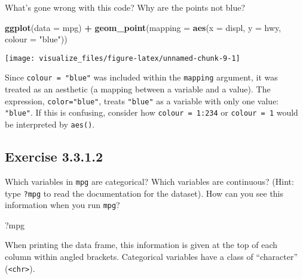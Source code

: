 \documentclass[]{book}
\newenvironment{Shaded}{\begin{snugshade}}{\end{snugshade}}
\newcommand{\DataTypeTok}[1]{\textcolor[rgb]{0.13,0.29,0.53}{#1}}
\newcommand{\KeywordTok}[1]{\textcolor[rgb]{0.13,0.29,0.53}{\textbf{#1}}}
\newcommand{\NormalTok}[1]{#1}
\newcommand{\OperatorTok}[1]{\textcolor[rgb]{0.81,0.36,0.00}{\textbf{#1}}}
\newcommand{\StringTok}[1]{\textcolor[rgb]{0.31,0.60,0.02}{#1}}
\theoremstyle{plain}
\theoremstyle{remark}
\begin{document}
What's gone wrong with this code? Why are the points not blue?

\begin{Shaded}
\begin{Highlighting}[]
\KeywordTok{ggplot}\NormalTok{(}\DataTypeTok{data =}\NormalTok{ mpg) }\OperatorTok{+}
\StringTok{  }\KeywordTok{geom_point}\NormalTok{(}\DataTypeTok{mapping =} \KeywordTok{aes}\NormalTok{(}\DataTypeTok{x =}\NormalTok{ displ, }\DataTypeTok{y =}\NormalTok{ hwy, }\DataTypeTok{colour =} \StringTok{"blue"}\NormalTok{))}
\end{Highlighting}
\end{Shaded}

\begin{center}\texttt{[image: visualize\_files/figure-latex/unnamed-chunk-9-1]} \end{center}

Since \texttt{colour\ =\ "blue"} was included within the
\texttt{mapping} argument, it was treated as an aesthetic (a mapping
between a variable and a value). The expression, \texttt{color="blue"},
treats \texttt{"blue"} as a variable with only one value:
\texttt{"blue"}. If this is confusing, consider how
\texttt{colour\ =\ 1:234} or \texttt{colour\ =\ 1} would be interpreted
by \texttt{aes()}.

\hypertarget{exercise-3.3.1.2}{%
\subsection*{\texorpdfstring{Exercise
{3.3.1.2}}{Exercise 3.3.1.2}}\label{exercise-3.3.1.2}}

Which variables in \texttt{mpg} are categorical? Which variables are
continuous? (Hint: type \texttt{?mpg} to read the documentation for the
dataset). How can you see this information when you run \texttt{mpg}?

\begin{Shaded}
\begin{Highlighting}[]
\NormalTok{?mpg}
\end{Highlighting}
\end{Shaded}

When printing the data frame, this information is given at the top of
each column within angled brackets. Categorical variables have a class
of ``character'' (\texttt{\textless{}chr\textgreater{}}).
\end{document}
